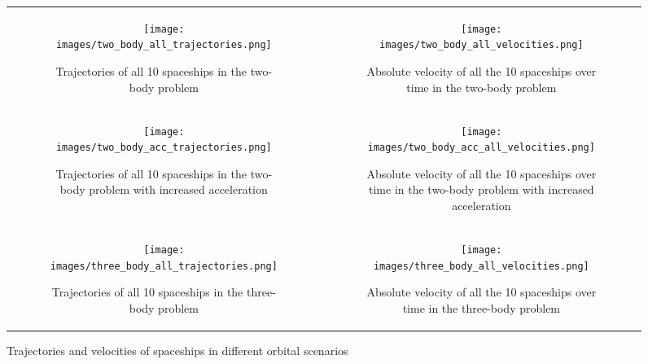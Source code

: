 \documentclass[12pt,a4paper]{article}
\begin{document}
\begin{figure}[H!]
    \centering
    \begin{tabular}{cc}
        \begin{subfigure}[b]{0.45\textwidth}
            \centering
            \texttt{[image: images/two\_body\_all\_trajectories.png]}
            \caption{Trajectories of all 10 spaceships in the two-body problem}
            \label{fig:two_body_trajectory}
        \end{subfigure} &
        \begin{subfigure}[b]{0.45\textwidth}
            \centering
            \texttt{[image: images/two\_body\_all\_velocities.png]}
            \caption{Absolute velocity of all the 10 spaceships over time in the two-body problem}
            \label{fig:two_body_velocity}
        \end{subfigure} \\
        \begin{subfigure}[b]{0.45\textwidth}
            \centering
            \texttt{[image: images/two\_body\_acc\_trajectories.png]}
            \caption{Trajectories of all 10 spaceships in the two-body problem with increased acceleration}
            \label{fig:two_body_acceleration_trajectory}
        \end{subfigure} &
        \begin{subfigure}[b]{0.45\textwidth}
            \centering
            \texttt{[image: images/two\_body\_acc\_all\_velocities.png]}
            \caption{Absolute velocity of all the 10 spaceships over time in the two-body problem with increased acceleration}
            \label{fig:two_body_acceleration_velocity}
        \end{subfigure} \\
        \begin{subfigure}[b]{0.45\textwidth}
            \centering
            \texttt{[image: images/three\_body\_all\_trajectories.png]}
            \caption{Trajectories of all 10 spaceships in the three-body problem}
            \label{fig:three_body_trajectory}
        \end{subfigure} &
        \begin{subfigure}[b]{0.45\textwidth}
            \centering
            \texttt{[image: images/three\_body\_all\_velocities.png]}
            \caption{Absolute velocity of all the 10 spaceships over time in the three-body problem}
            \label{fig:three_body_velocity}
        \end{subfigure}
    \end{tabular}
    \caption{Trajectories and velocities of spaceships in different orbital scenarios}
    \label{fig:data_generation_simulation}
\end{figure}
\end{document}
